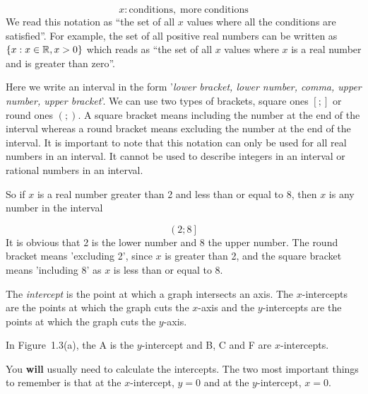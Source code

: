     \begin{equation}
    x:\mathrm{conditions,\; more\; conditions}\tag{1.5}
      \end{equation}
          \label{m39337*id236100}We read this notation as ``the set of all $x$ values where all the conditions are satisfied''. For example, the set of all positive real numbers can be written as $\{x:x\in \mathbb{R},x>{}0\}$ which reads as ``the set of all $x$ values where $x$ is a real number and is greater than zero''.\par 
        \label{m39337*uid44}
            \nopagebreak
          \label{m39337*id236181}Here we write an interval in the form '\textsl{lower bracket, lower number, comma, upper number, upper bracket}'. We can use two types of brackets, square ones $\left[;\right]$ or round ones $\left(;\right)$. A square bracket means including the number at the end of the interval whereas a round bracket means excluding the number at the end of the interval. It is important to note that this notation can only be used for all real numbers in an interval. It cannot be used to describe integers in an interval or rational numbers in an interval.\par 
          \label{m39337*id236225}So if $x$ is a real number greater than 2 and less than or equal to 8, then $x$ is any number in the interval\par 
          \label{m39337*uid45}\nopagebreak\noindent{}
    \begin{equation}
    \left(2;8\right]\tag{1.6}
      \end{equation}
          \label{m39337*id236274}It is obvious that 2 is the lower number and 8 the upper number. The round bracket means 'excluding 2', since $x$ is greater than 2, and the square bracket means 'including 8' as $x$ is less than or equal to 8.\par 
      \label{m39337*uid46}
            \nopagebreak
        \label{m39337*id236308}The \textsl{intercept} is the point at which a graph intersects an axis. The $x$-intercepts are the points at which the graph cuts the $x$-axis and the $y$-intercepts are the points at which the graph cuts the $y$-axis.\par 
        \label{m39337*id236356}In Figure~1.3(a), the A is the $y$-intercept and B, C and F are $x$-intercepts.\par 
        \label{m39337*id236384}You \textbf{will} usually need to calculate the intercepts. The two most important things to remember is that at the $x$-intercept, $y=0$ and at the $y$-intercept, $x=0$.\par 
